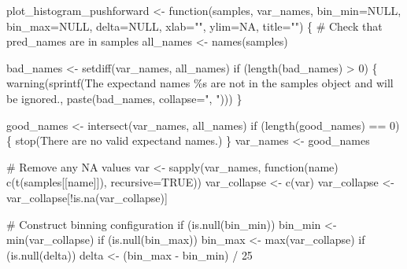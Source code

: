 \documentclass[
  letterpaper,
  DIV=11,
  numbers=noendperiod]{scrartcl}
\newenvironment{Shaded}{\begin{snugshade}}{\end{snugshade}}
\newcommand{\AttributeTok}[1]{\textcolor[rgb]{0.40,0.45,0.13}{#1}}
\newcommand{\CommentTok}[1]{\textcolor[rgb]{0.37,0.37,0.37}{#1}}
\newcommand{\ConstantTok}[1]{\textcolor[rgb]{0.56,0.35,0.01}{#1}}
\newcommand{\ControlFlowTok}[1]{\textcolor[rgb]{0.00,0.23,0.31}{#1}}
\newcommand{\DecValTok}[1]{\textcolor[rgb]{0.68,0.00,0.00}{#1}}
\newcommand{\FunctionTok}[1]{\textcolor[rgb]{0.28,0.35,0.67}{#1}}
\newcommand{\NormalTok}[1]{\textcolor[rgb]{0.00,0.23,0.31}{#1}}
\newcommand{\OtherTok}[1]{\textcolor[rgb]{0.00,0.23,0.31}{#1}}
\newcommand{\SpecialCharTok}[1]{\textcolor[rgb]{0.37,0.37,0.37}{#1}}
\newcommand{\StringTok}[1]{\textcolor[rgb]{0.13,0.47,0.30}{#1}}
\begin{document}
\begin{Shaded}
\begin{Highlighting}[]
\NormalTok{plot\_histogram\_pushforward }\OtherTok{\textless{}{-}} \ControlFlowTok{function}\NormalTok{(samples, var\_names,}
                                       \AttributeTok{bin\_min=}\ConstantTok{NULL}\NormalTok{, }\AttributeTok{bin\_max=}\ConstantTok{NULL}\NormalTok{, }\AttributeTok{delta=}\ConstantTok{NULL}\NormalTok{,}
                                       \AttributeTok{xlab=}\StringTok{""}\NormalTok{, }\AttributeTok{ylim=}\ConstantTok{NA}\NormalTok{, }\AttributeTok{title=}\StringTok{""}\NormalTok{) \{}
  \CommentTok{\# Check that pred\_names are in samples}
\NormalTok{  all\_names }\OtherTok{\textless{}{-}} \FunctionTok{names}\NormalTok{(samples)}

\NormalTok{  bad\_names }\OtherTok{\textless{}{-}} \FunctionTok{setdiff}\NormalTok{(var\_names, all\_names)}
  \ControlFlowTok{if}\NormalTok{ (}\FunctionTok{length}\NormalTok{(bad\_names) }\SpecialCharTok{\textgreater{}} \DecValTok{0}\NormalTok{) \{}
    \FunctionTok{warning}\NormalTok{(}\FunctionTok{sprintf}\NormalTok{(}\StringTok{\textquotesingle{}The expectand names \%s are not in the \textasciigrave{}samples\textasciigrave{} object and will be ignored.\textquotesingle{}}\NormalTok{,}
                    \FunctionTok{paste}\NormalTok{(bad\_names, }\AttributeTok{collapse=}\StringTok{", "}\NormalTok{)))}
\NormalTok{  \}}

\NormalTok{  good\_names }\OtherTok{\textless{}{-}} \FunctionTok{intersect}\NormalTok{(var\_names, all\_names)}
  \ControlFlowTok{if}\NormalTok{ (}\FunctionTok{length}\NormalTok{(good\_names) }\SpecialCharTok{==} \DecValTok{0}\NormalTok{) \{}
    \FunctionTok{stop}\NormalTok{(}\StringTok{\textquotesingle{}There are no valid expectand names.\textquotesingle{}}\NormalTok{)}
\NormalTok{  \}}
\NormalTok{  var\_names }\OtherTok{\textless{}{-}}\NormalTok{ good\_names}

  \CommentTok{\# Remove any NA values}
\NormalTok{  var }\OtherTok{\textless{}{-}} \FunctionTok{sapply}\NormalTok{(var\_names,}
                \ControlFlowTok{function}\NormalTok{(name) }\FunctionTok{c}\NormalTok{(}\FunctionTok{t}\NormalTok{(samples[[name]]), }\AttributeTok{recursive=}\ConstantTok{TRUE}\NormalTok{))}
\NormalTok{  var\_collapse }\OtherTok{\textless{}{-}} \FunctionTok{c}\NormalTok{(var)}
\NormalTok{  var\_collapse }\OtherTok{\textless{}{-}}\NormalTok{ var\_collapse[}\SpecialCharTok{!}\FunctionTok{is.na}\NormalTok{(var\_collapse)]}

  \CommentTok{\# Construct binning configuration}
  \ControlFlowTok{if}\NormalTok{ (}\FunctionTok{is.null}\NormalTok{(bin\_min))}
\NormalTok{    bin\_min }\OtherTok{\textless{}{-}} \FunctionTok{min}\NormalTok{(var\_collapse)}
  \ControlFlowTok{if}\NormalTok{ (}\FunctionTok{is.null}\NormalTok{(bin\_max))}
\NormalTok{    bin\_max }\OtherTok{\textless{}{-}} \FunctionTok{max}\NormalTok{(var\_collapse)}
  \ControlFlowTok{if}\NormalTok{ (}\FunctionTok{is.null}\NormalTok{(delta))}
\NormalTok{    delta }\OtherTok{\textless{}{-}}\NormalTok{ (bin\_max }\SpecialCharTok{{-}}\NormalTok{ bin\_min) }\SpecialCharTok{/} \DecValTok{25}


\end{Highlighting}
\end{Shaded}
\end{document}
